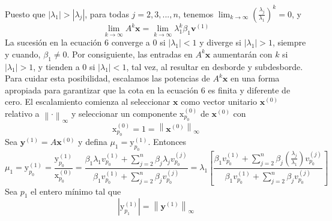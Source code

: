 \documentclass[12pt, a4paper]{article}
\numberwithin{subsection}{section} %
\begin{document}
        Puesto que $\left| \lambda_{1} \right| > \left| \lambda_{j} \right|$, para todas $j = 2, 3, ..., n$, tenemos $\lim_{k \to \infty } \left( \frac{\lambda_{j}}{\lambda_{1}} \right)^{k} = 0$, y
        \begin{equation}
        \lim_{k \to \infty } A^{k} \textbf{x} = \lim_{k \to \infty } \lambda_{1}^{k} \beta_{1} \textbf{v}^{\left( 1 \right)}
        \end{equation}
        La sucesión en la ecuación 6 converge a $0$ si $\left| \lambda_{1} \right| < 1$ y diverge si $\left| \lambda_{1} \right| > 1$, siempre y cuando, $\beta_{1} \neq 0$. Por consiguiente, las entradas en $A^{k} \textbf{x}$ aumentarán con $k$ si $\left| \lambda_{1} \right| > 1$, y tienden a $0$ si $\left| \lambda_{1} \right| < 1$, tal vez, al resultar en desborde y subdesborde. Para cuidar esta posibilidad, escalamos las potencias de $A^{k} \textbf{x}$ en una forma apropiada para garantizar que la cota en la ecuación 6 es finita y diferente de cero. El escalamiento comienza al seleccionar $\textbf{x}$ como vector unitario $\textbf{x}^{\left( 0 \right)}$ relativo a $\left\| \cdot \right\|_{\infty }$ y seleccionar un componente $\text{x}_{p_{0}}^{\left( 0 \right)}$ de $\textbf{x}^{\left( 0 \right)}$ con
        \begin{equation*}
        \text{x}_{p_{0}}^{\left( 0 \right)} = 1 = \left\| \textbf{x}^{\left( 0 \right)} \right\|_{\infty }
        \end{equation*}
        Sea $\textbf{y}^{\left( 1 \right)} = A \textbf{x}^{\left( 0 \right)}$ y defina $\mu_{1} = \text{y}_{p_{0}}^{\left( 1 \right)}$. Entonces
        \begin{equation*}
        \mu_{1} = \text{y}_{p_{0}}^{\left( 1 \right)} = \frac{\text{y}_{p_{0}}^{\left( 1 \right)}}{\text{x}_{p_{0}}^{\left( 0 \right)}} = \frac{\beta_{1} \lambda_{1} v_{p_{0}}^{\left( 1 \right)}+\sum_{j = 2}^{n}\beta_{j} \lambda_{j} v_{p_{0}}^{\left( j \right)}}{\beta_{1} v_{p_{0}}^{\left( 1 \right)}+\sum_{j = 2}^{n}\beta_{j} v_{p_{0}}^{\left( j \right)}} = \lambda_{1} \left[ \frac{\beta_{1} v_{p_{0}}^{\left( 1 \right)}+\sum_{j = 2}^{n}\beta_{j} \left( \frac{\lambda_{j}}{\lambda_{1}} \right) v_{p_{0}}^{\left( j \right)}}{\beta_{1} v_{p_{0}}^{\left( 1 \right)}+\sum_{j = 2}^{n}\beta_{j}v_{p_{0}}^{\left( j \right)}} \right]
        \end{equation*}
        Sea $p_{1}$ el entero mínimo tal que
        \begin{equation*}
        \left| \text{y}_{p_{1}}^{\left( 1 \right)} \right| = \left\| \textbf{y}^{\left( 1 \right)} \right\|_{\infty }
        \end{equation*}
\end{document}
